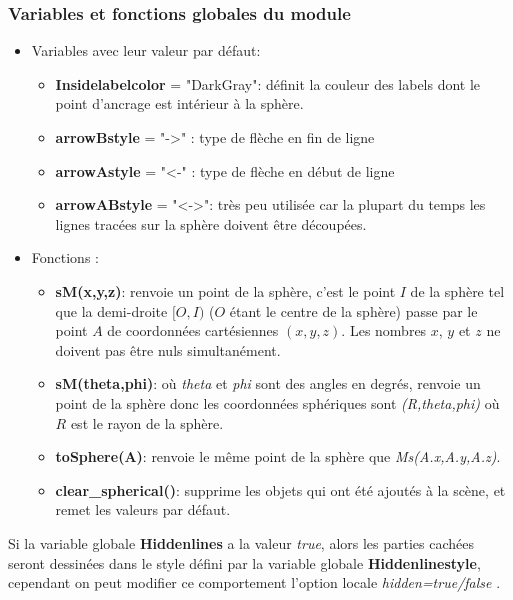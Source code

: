 \subsubsection{Variables et fonctions globales du module}

\begin{itemize}
    \item Variables avec leur valeur par défaut:
        \begin{itemize}
            \item \textbf{Insidelabelcolor} = "DarkGray": définit la couleur des labels dont le point d'ancrage est intérieur à la sphère.
            \item \textbf{arrowBstyle} = "->" : type de flèche en fin de ligne
            \item \textbf{arrowAstyle} = "<-" : type de flèche en début de ligne
            \item \textbf{arrowABstyle} = "<->": très peu utilisée car la plupart du temps les lignes tracées sur la sphère doivent être découpées.
        \end{itemize}
    \item Fonctions :
        \begin{itemize}
            \item \textbf{sM(x,y,z)}: renvoie un point de la sphère, c'est le point $I$ de la sphère tel que la demi-droite $[O,I)$ ($O$ étant le centre de la sphère) passe par le point $A$ de coordonnées cartésiennes $(x,y,z)$. Les nombres $x$, $y$ et $z$ ne doivent pas être nuls simultanément.
            \item \textbf{sM(theta,phi)}: où \emph{theta} et \emph{phi} sont des angles en degrés, renvoie un point de la sphère donc les coordonnées sphériques sont \emph{(R,theta,phi)} où $R$ est le rayon de la sphère.
            \item \textbf{toSphere(A)}: renvoie le même point de la sphère que \emph{Ms(A.x,A.y,A.z)}.
            \item \textbf{clear\_spherical()}: supprime les objets qui ont été ajoutés à la scène, et remet les valeurs par défaut.
        \end{itemize}
\end{itemize}

Si la variable globale \textbf{Hiddenlines} a la valeur \emph{true}, alors les parties cachées seront dessinées dans le style défini par la variable globale \textbf{Hiddenlinestyle}, cependant on peut modifier ce comportement l'option locale \emph{hidden=true/false} .

